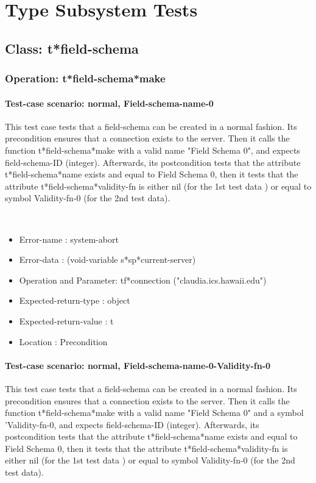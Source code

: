 \chapter{Type Subsystem Tests}
\section {Class: t*field-schema}
\subsection {Operation: t*field-schema*make}
\subsubsection {Test-case scenario: normal, Field-schema-name-0}


This test case tests that a field-schema can be created in a normal fashion.
Its precondition ensures that a connection exists to the server.
Then it calls the function t*field-schema*make  with a valid name "Field Schema 0", and expects field-schema-ID (integer).
Afterwards, its postcondition tests that the attribute t*field-schema*name exists and equal to Field Schema 0, then it tests that the attribute t*field-schema*validity-fn is either nil (for the 1st test data ) or equal to symbol Validity-fn-0 (for the 2nd test data).


\
\begin {itemize}
\item 	Error-name             : system-abort
\item Error-data             : (void-variable s*sp*current-server)
\item Operation and Parameter: tf*connection ("claudia.ics.hawaii.edu")
\item Expected-return-type   : object
\item Expected-return-value  : t
\item Location               : Precondition



\end {itemize}
\subsubsection {Test-case scenario: normal, Field-schema-name-0-Validity-fn-0}


This test case tests that a field-schema can be created in a normal fashion.
Its precondition ensures that a connection exists to the server.
Then it calls the function t*field-schema*make  with a valid name "Field Schema 0" and a symbol 'Validity-fn-0, and expects field-schema-ID (integer).
Afterwards, its postcondition tests that the attribute t*field-schema*name exists and equal to Field Schema 0, then it tests that the attribute t*field-schema*validity-fn is either nil (for the 1st test data ) or equal to symbol Validity-fn-0 (for the 2nd test data).


